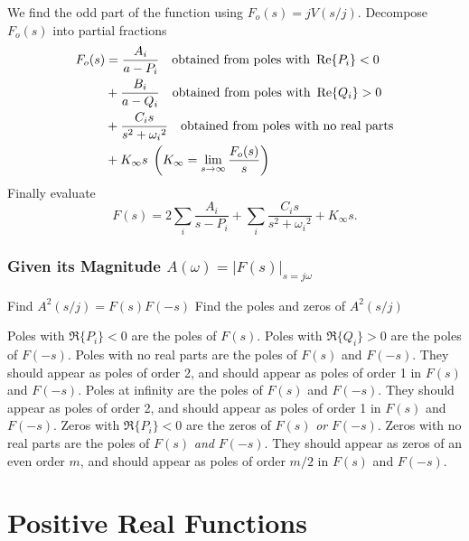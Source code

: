 \documentclass{report}
\begin{document}
\begin{enumerate}
	\ii We find the odd part of the function using $F_o(s) = jV(s/j)$.
	\ii Decompose $F_o(s)$ into partial fractions
	\begin{align*}
		F_o(s) & = \frac{A_i}{a-P_i}\quad \text{obtained from poles with } \Re\{P_i\} < 0              \\
		       & + \frac{B_i}{a-Q_i}\quad \text{obtained from poles with } \Re\{Q_i\} > 0              \\
		       & + \frac{C_i s}{s^2 + {\omega_i}^2}\quad \text{obtained from poles with no real parts} \\
		       & + K_\infty s\;\left(K_\infty=\lim_{s \to \infty} \frac{F_o(s)}{s}\right)
	\end{align*}
	\ii Finally evaluate
	\[
		F(s) = 2 \sum_{i} \frac{A_i}{s-P_i} + \sum_{i} \frac{C_i s}{s^2 + {\omega_i}^2} + K_\infty s
		.\]
\end{enumerate}

\subsection{Given its Magnitude $A(\omega) = |F(s)|_{s=j\omega}$}

\begin{enumerate}
	\ii Find $A^2(s/j) = F(s)F(-s)$
	\ii Find the poles and zeros of $A^2(s/j)$
	\begin{itemize}
		\ii Poles with $\Re\{P_i\} < 0$ are the poles of $F(s)$.
		\ii Poles with $\Re\{Q_i\} > 0$ are the poles of $F(-s)$.
		\ii Poles with no real parts are the poles of $F(s)$ and $F(-s)$. They should appear as poles of order 2, and should appear as poles of order 1 in $F(s)$ and $F(-s)$.
		\ii Poles at infinity are the poles of $F(s)$ and $F(-s)$. They should appear as poles of order 2, and should appear as poles of order 1 in $F(s)$ and $F(-s)$.
		\ii Zeros with $\Re\{P_i\} < 0$ are the zeros of $F(s)$ \emph{or} $F(-s)$.
		\ii Zeros with no real parts are the poles of $F(s)$ \emph{and} $F(-s)$. They should appear as zeros of an even order $m$, and should appear as poles of order $m/2$ in $F(s)$ and $F(-s)$.
	\end{itemize}
\end{enumerate}

\chapter{Positive Real Functions}

\end{document}
